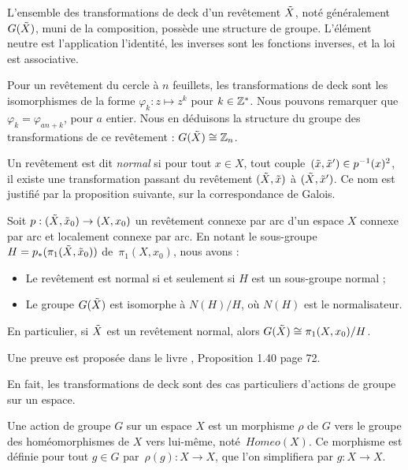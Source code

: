 L'ensemble des transformations de deck d'un revêtement $\Tilde{X}$, noté généralement $G(\Tilde{X})$, muni de la composition, possède une structure de groupe. L'élément neutre est l'application l'identité, les inverses sont les fonctions inverses, et la loi est associative. 

\begin{exemple}
Pour un revêtement du cercle à $n$ feuillets, les transformations de deck sont les isomorphismes de la forme $\varphi_k:z\mapsto z^k$ pour $k\in\mathbb{Z}^*$. Nous pouvons remarquer que $\varphi_k=\varphi_{an+k}$, pour $a$ entier. Nous en déduisons la structure du groupe des transformations de ce revêtement : $G(\Tilde{X})\cong\mathbb{Z}_n$.
\end{exemple}

Un revêtement est dit \emph{normal} si pour tout $x\in X$, tout couple~$(\Tilde{x},\Tilde{x}')\in p^{-1}(x)^2$, il existe une transformation passant du revêtement $(\Tilde{X},\Tilde{x})$ à $(\Tilde{X},\Tilde{x}')$. Ce nom est justifié par la proposition suivante, sur la correspondance de Galois.

\begin{proposition}
Soit $p:(\Tilde{X},\Tilde{x}_0)\to(X,x_0)$ un revêtement connexe par arc d'un espace $X$ connexe par arc et localement connexe par arc. En notant le sous-groupe $H=p_\ast(\pi_1(\Tilde{X},\Tilde{x}_0))$ de~$\pi_1(X,x_0)$, nous avons : \begin{itemize}
    \item Le revêtement est normal si et seulement si $H$ est un sous-groupe normal ;
    \item Le groupe $G(\Tilde{X})$ est isomorphe à $N(H)/H$, où $N(H)$ est le normalisateur.
\end{itemize}
En particulier, si $\Tilde{X}$ est un revêtement normal, alors $G(\Tilde{X})\cong \pi_1(X,x_0)/H$.
\end{proposition}
Une preuve est proposée dans le livre \cite{Hatcher}, Proposition 1.40 page 72.

\bigskip En fait, les transformations de deck sont des cas particuliers d'actions de groupe sur un espace.

\begin{definition}\label{def:group-action}
Une action de groupe $G$ sur un espace $X$ est un morphisme $\rho$ de $G$ vers le groupe des homéomorphismes de $X$ vers lui-même, noté~$Homeo(X)$. Ce morphisme est définie pour tout $g\in G$ par~$\rho(g):X\to X$, que l'on simplifiera par $g:X\to X$.
\end{definition}

